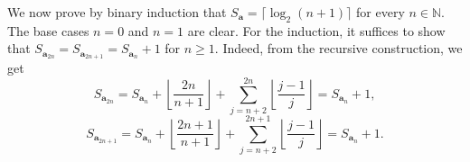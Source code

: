 \documentclass{article}
\newcommand{\N}{\mathbb{N}}
\begin{document}
We now prove by binary induction that $S_{\mathbf{a}} = \lceil \log_2 (n + 1) \rceil$ for every $n \in \N$.
The base cases $n = 0$ and $n = 1$ are clear.
For the induction, it suffices to show that $S_{\mathbf{a}_{2n}} = S_{\mathbf{a}_{2n + 1}} = S_{\mathbf{a}_n} + 1$ for $n \geq 1$.
Indeed, from the recursive construction, we get
\[ S_{\mathbf{a}_{2n}} = S_{\mathbf{a}_n} + \left\lfloor \frac{2n}{n + 1} \right\rfloor + \sum_{j = n + 2}^{2n} \left\lfloor \frac{j - 1}{j} \right\rfloor = S_{\mathbf{a}_n} + 1, \]
\[ S_{\mathbf{a}_{2n + 1}} = S_{\mathbf{a}_n} + \left\lfloor \frac{2n + 1}{n + 1} \right\rfloor + \sum_{j = n + 2}^{2n + 1} \left\lfloor \frac{j - 1}{j} \right\rfloor = S_{\mathbf{a}_n} + 1. \]
\end{document}
